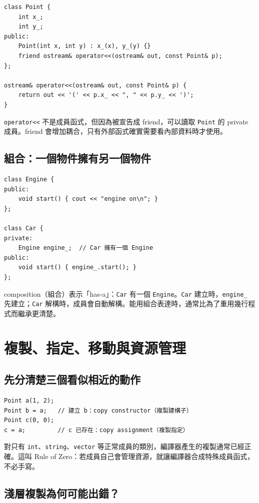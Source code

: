 \documentclass[11pt,a4paper]{article}
\newcommand{\code}[1]{\texttt{#1}}
\begin{document}
\begin{lstlisting}
class Point {
    int x_;
    int y_;
public:
    Point(int x, int y) : x_(x), y_(y) {}
    friend ostream& operator<<(ostream& out, const Point& p);
};

ostream& operator<<(ostream& out, const Point& p) {
    return out << '(' << p.x_ << ", " << p.y_ << ')';
}
\end{lstlisting}

\code{operator<<} 不是成員函式，但因為被宣告成 friend，可以讀取 \code{Point} 的 private 成員。friend 會增加耦合，只有外部函式確實需要看內部資料時才使用。

\subsection{組合：一個物件擁有另一個物件}

\begin{lstlisting}
class Engine {
public:
    void start() { cout << "engine on\n"; }
};

class Car {
private:
    Engine engine_;  // Car 擁有一個 Engine
public:
    void start() { engine_.start(); }
};
\end{lstlisting}

composition（組合）表示「has-a」：\code{Car} 有一個 \code{Engine}。\code{Car} 建立時，\code{engine\_} 先建立；\code{Car} 解構時，成員會自動解構。能用組合表達時，通常比為了重用幾行程式而繼承更清楚。

\section{複製、指定、移動與資源管理}

\subsection{先分清楚三個看似相近的動作}

\begin{lstlisting}
Point a(1, 2);
Point b = a;   // 建立 b：copy constructor（複製建構子）
Point c(0, 0);
c = a;         // c 已存在：copy assignment（複製指定）
\end{lstlisting}

對只有 \code{int}、\code{string}、\code{vector} 等正常成員的類別，編譯器產生的複製通常已經正確。這叫 Rule of Zero：若成員自己會管理資源，就讓編譯器合成特殊成員函式，不必手寫。

\subsection{淺層複製為何可能出錯？}
\end{document}
